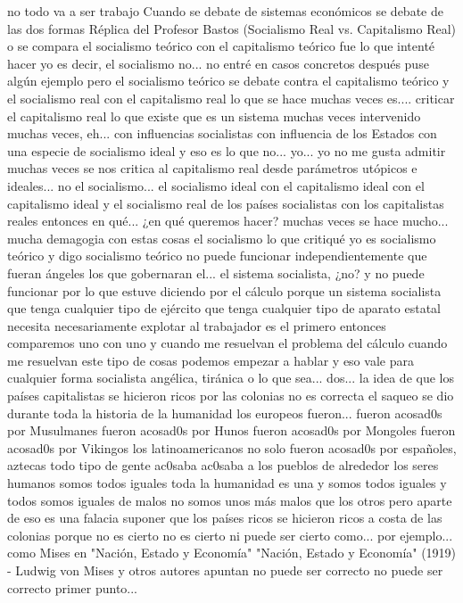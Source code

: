 no todo va a ser trabajo Cuando se debate de sistemas económicos se debate de las dos formas
Réplica del Profesor Bastos (Socialismo Real vs. Capitalismo Real)
o se compara el socialismo teórico con el capitalismo teórico fue lo que intenté hacer yo es decir, el socialismo no... no entré en casos concretos
después puse algún ejemplo pero el socialismo teórico se debate contra el capitalismo teórico y el socialismo real con el capitalismo real
lo que se hace muchas veces es.... criticar el capitalismo real lo que existe que es un sistema
muchas veces intervenido muchas veces, eh... con influencias socialistas con influencia de los Estados
con una especie de socialismo ideal y eso es lo que no... yo... yo no me gusta admitir muchas veces se nos critica al capitalismo real
desde parámetros utópicos e ideales... no el socialismo... el socialismo ideal con el capitalismo ideal
con el capitalismo ideal y el socialismo real de los países socialistas con los capitalistas reales entonces en qué... ¿en qué queremos hacer?
muchas veces se hace mucho... mucha demagogia con estas cosas el socialismo lo que critiqué yo es socialismo teórico
y digo socialismo teórico no puede funcionar independientemente que fueran ángeles los que gobernaran el...
el sistema socialista, ¿no? y no puede funcionar por lo que estuve diciendo por el cálculo porque un sistema socialista
que tenga cualquier tipo de ejército que tenga cualquier tipo de aparato estatal necesita necesariamente explotar al trabajador es el primero
entonces comparemos uno con uno y cuando me resuelvan el problema del cálculo cuando me resuelvan este tipo de cosas podemos empezar a hablar
y eso vale para cualquier forma socialista angélica, tiránica o lo que sea...
dos... la idea de que los países capitalistas se hicieron ricos por las colonias no es correcta
el saqueo se dio durante toda la historia de la humanidad los europeos fueron... fueron acosad0s por Musulmanes
fueron acosad0s por Hunos fueron acosad0s por Mongoles fueron acosad0s por Vikingos
los latinoamericanos no solo fueron acosad0s por españoles, aztecas todo tipo de gente ac0saba ac0saba a los pueblos de alrededor
los seres humanos somos todos iguales toda la humanidad es una y somos todos iguales y todos somos iguales de malos no somos unos más malos que los otros
pero aparte de eso es una falacia suponer que los países ricos se hicieron ricos a costa de las colonias
porque no es cierto no es cierto ni puede ser cierto como... por ejemplo... como Mises en "Nación, Estado y Economía"
"Nación, Estado y Economía" (1919) - Ludwig von Mises
y otros autores apuntan no puede ser correcto no puede ser correcto primer punto...
